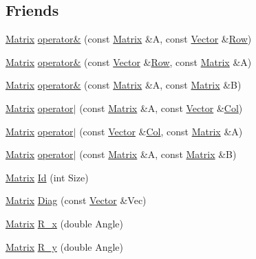 \subsection*{Friends}
\begin{DoxyCompactItemize}
\item 
\hyperlink{classMatrix}{Matrix} \hyperlink{classMatrix_abac5bb38f6d2767db9359ff26f2d772b}{operator\&} (const \hyperlink{classMatrix}{Matrix} \&A, const \hyperlink{classVector}{Vector} \&\hyperlink{classMatrix_af11392830874339383f4449d6efc3e71}{Row})
\item 
\hyperlink{classMatrix}{Matrix} \hyperlink{classMatrix_a52818bc7441c2d401f0378b7c1002da6}{operator\&} (const \hyperlink{classVector}{Vector} \&\hyperlink{classMatrix_af11392830874339383f4449d6efc3e71}{Row}, const \hyperlink{classMatrix}{Matrix} \&A)
\item 
\hyperlink{classMatrix}{Matrix} \hyperlink{classMatrix_addc226f84201673fed592aef51237564}{operator\&} (const \hyperlink{classMatrix}{Matrix} \&A, const \hyperlink{classMatrix}{Matrix} \&B)
\item 
\hyperlink{classMatrix}{Matrix} \hyperlink{classMatrix_ab1d3ddb78982da536099cac5e4734999}{operator$|$} (const \hyperlink{classMatrix}{Matrix} \&A, const \hyperlink{classVector}{Vector} \&\hyperlink{classMatrix_a02c825325655a07eb94e4a57478a4c18}{Col})
\item 
\hyperlink{classMatrix}{Matrix} \hyperlink{classMatrix_affee7481d9187bfc81b85b0fcc9f2c55}{operator$|$} (const \hyperlink{classVector}{Vector} \&\hyperlink{classMatrix_a02c825325655a07eb94e4a57478a4c18}{Col}, const \hyperlink{classMatrix}{Matrix} \&A)
\item 
\hyperlink{classMatrix}{Matrix} \hyperlink{classMatrix_adb2721510b1e82a72241a37d766f7abb}{operator$|$} (const \hyperlink{classMatrix}{Matrix} \&A, const \hyperlink{classMatrix}{Matrix} \&B)
\item 
\hyperlink{classMatrix}{Matrix} \hyperlink{classMatrix_ac71a8aaf67fa3c90f274788d91002af9}{Id} (int Size)
\item 
\hyperlink{classMatrix}{Matrix} \hyperlink{classMatrix_af7d7bb183b22c5c942a8afdadc433bc2}{Diag} (const \hyperlink{classVector}{Vector} \&Vec)
\item 
\hyperlink{classMatrix}{Matrix} \hyperlink{classMatrix_ae452267b1d1da6280386846d97ec4e4f}{R\-\_\-x} (double Angle)
\item 
\hyperlink{classMatrix}{Matrix} \hyperlink{classMatrix_a66b3b116958d5c2f1c528faa04c71674}{R\-\_\-y} (double Angle)
\item 

\end{DoxyCompactItemize}
